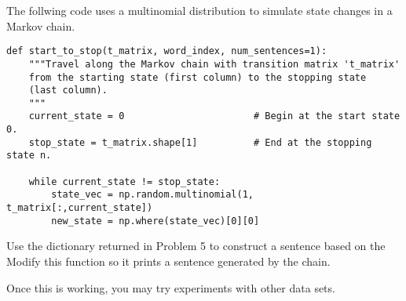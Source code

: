 

\begin{problem}
The follwing code uses a multinomial distribution to simulate state changes in a Markov chain.

\begin{lstlisting}
def start_to_stop(t_matrix, word_index, num_sentences=1):
	"""Travel along the Markov chain with transition matrix 't_matrix'
	from the starting state (first column) to the stopping state
	(last column).
	"""
	current_state = 0						# Begin at the start state 0.
	stop_state = t_matrix.shape[1] 			# End at the stopping state n.

	while current_state != stop_state:
		state_vec = np.random.multinomial(1, t_matrix[:,current_state])
		new_state = np.where(state_vec)[0][0]
\end{lstlisting}

Use the dictionary returned in Problem 5 to construct a sentence based on the 
Modify this function so it prints a sentence generated by the chain.

Once this is working, you may try experiments with other data sets.
\end{problem}

